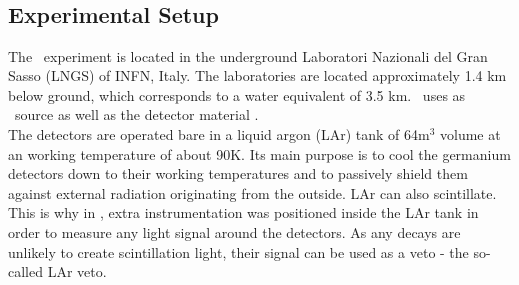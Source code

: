 \documentclass[encoding=utf8,british]{tumphthesis}
\begin{document}

 


\section{\gerda\ \PII}
\label{sec:gerda}


\subsection{Experimental Setup}
\label{sec:ExSetup}
The \gerda\ experiment is located in the underground Laboratori Nazionali del Gran Sasso (LNGS) of INFN, Italy.
The laboratories are located approximately 1.4 km below ground, which corresponds to a water equivalent of 3.5 km.
\gerda\ uses  as \onbb\ source as well as the detector material \cite{agostini_background_2017}.
\\

The detectors are operated bare in a liquid argon (LAr) tank of 64m$^3$ volume at an working temperature of about 90K.
Its main purpose is to cool the germanium detectors down to their working temperatures and to passively shield them against external radiation originating from the outside.
LAr can also scintillate.
This is why in \PII, extra instrumentation was positioned inside the LAr tank in order to measure any light signal around the detectors.
As any  decays are unlikely to create scintillation light, their signal can be used as a veto - the so-called LAr veto.
\end{document}
